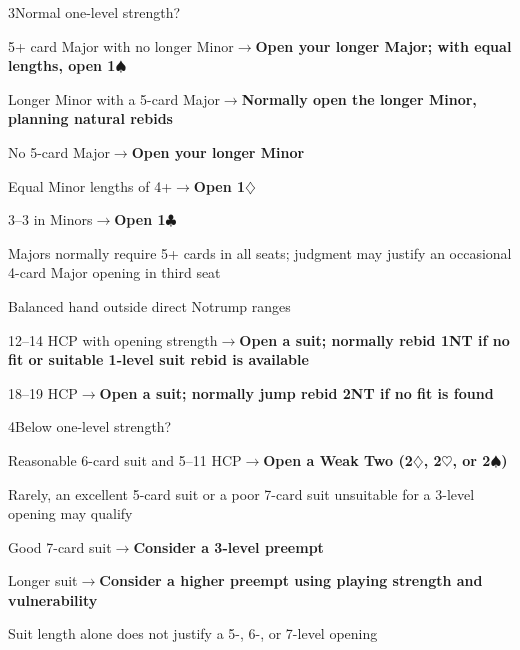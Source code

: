 \documentclass[10pt,letterpaper]{article}
\newcommand{\C}{\ensuremath{\clubsuit}}
\newcommand{\D}{\ensuremath{\diamondsuit}}
\newcommand{\Hh}{\ensuremath{\heartsuit}}
\renewcommand{\S}{\ensuremath{\spadesuit}}
\begin{document}
\begin{minipage}[t]{0.485\textwidth}\vspace{0pt}

\begin{guidecard}{\textsf{\footnotesize 3}\quad Normal one-level strength?}
\begin{branches}
\item 5+ card Major with no longer Minor\;\ensuremath{\longrightarrow}\;\textbf{Open your longer Major; with equal lengths, open 1\S{}}
\item Longer Minor with a 5-card Major\;\ensuremath{\longrightarrow}\;\textbf{Normally open the longer Minor, planning natural rebids}
\item No 5-card Major\;\ensuremath{\longrightarrow}\;\textbf{Open your longer Minor}
\begin{branches}
\item Equal Minor lengths of 4+\;\ensuremath{\longrightarrow}\;\textbf{Open 1\D{}}
\item 3--3 in Minors\;\ensuremath{\longrightarrow}\;\textbf{Open 1\C{}}
\end{branches}
\item Majors normally require 5+ cards in all seats; judgment may justify an occasional 4-card Major opening in third seat
\item Balanced hand outside direct Notrump ranges
\begin{branches}
\item 12--14 HCP with opening strength\;\ensuremath{\longrightarrow}\;\textbf{Open a suit; normally rebid 1NT if no fit or suitable 1-level suit rebid is available}
\item 18--19 HCP\;\ensuremath{\longrightarrow}\;\textbf{Open a suit; normally jump rebid 2NT if no fit is found}
\end{branches}
\end{branches}
\end{guidecard}

\begin{guidecard}{\textsf{\footnotesize 4}\quad Below one-level strength?}
\begin{branches}
\item Reasonable 6-card suit and 5--11 HCP\;\ensuremath{\longrightarrow}\;\textbf{Open a Weak Two (2\D{}, 2\Hh{}, or 2\S{})}
\begin{branches}
\item Rarely, an excellent 5-card suit or a poor 7-card suit unsuitable for a 3-level opening may qualify
\end{branches}
\item Good 7-card suit\;\ensuremath{\longrightarrow}\;\textbf{Consider a 3-level preempt}
\item Longer suit\;\ensuremath{\longrightarrow}\;\textbf{Consider a higher preempt using playing strength and vulnerability}
\item Suit length alone does not justify a 5-, 6-, or 7-level opening
\end{branches}
\end{guidecard}


\end{minipage}
\end{document}
